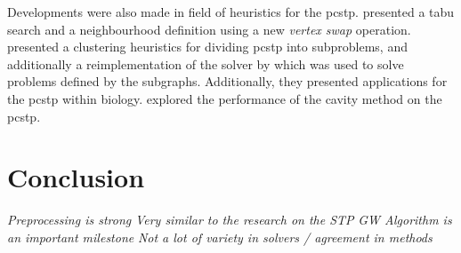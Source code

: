  Developments were also made in field of heuristics for the \gls{pcstp}. \citet{fu2014knowledge} presented a tabu search and a neighbourhood definition
  using a new \textit{vertex swap} operation.
  \citet{akhmedov2016divide} presented a clustering heuristics for dividing \gls{pcstp} into subproblems,
  and additionally a
  reimplementation of the solver by \citet{ljubic2005solving} which was used to solve problems defined by the subgraphs. Additionally, they presented
  applications for the \gls{pcstp} within biology.
  \citet{biazzo2012performance} explored the performance of the cavity method on the \gls{pcstp}.
  


\clearpage








\section{Conclusion}


\textit{Preprocessing is strong}
\textit{Very similar to the research on the STP}
\textit{GW Algorithm is an important milestone}
\textit{Not a lot of variety in solvers / agreement in methods}


